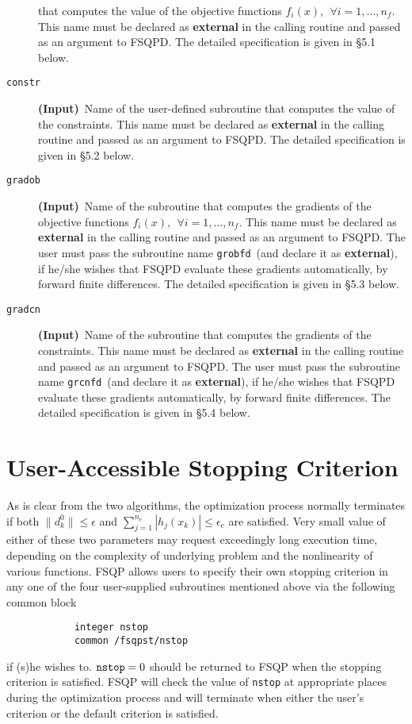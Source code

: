\begin{description}
                 that computes the value of the objective 
        functions $f_i(x),~~\forall i=1,\ldots,n_f.$ This name must
        be declared as {\bf external} in the calling routine 
        and passed as an argument to FSQPD.
        The detailed specification is given in \S 5.1 below.
\item[\tt constr]   {\bf (Input)}~Name of the user-defined subroutine
        that computes the value of the constraints. This name must
        be declared as {\bf external} in the calling routine 
        and passed as an argument to FSQPD.
        The detailed specification is given in \S 5.2 below. 
\item[\tt gradob]   {\bf (Input)}~Name of the subroutine that
        computes the gradients of the objective 
        functions $f_i(x),~~\forall i=1,\ldots,n_f.$ This name must
        be declared as {\bf external} in the calling routine 
        and passed as an argument to FSQPD.
        The user must pass the subroutine name 
        {\tt grobfd}~(and declare it as {\bf external}), 
        if he/she wishes that FSQPD evaluate
        these gradients automatically, by forward finite differences.
        The detailed specification is given in \S 5.3 below.
\item[\tt gradcn]   {\bf (Input)}~Name of the subroutine that
          computes the gradients of the constraints. 
          This name must be declared as {\bf external} in the calling 
          routine and passed as an argument to FSQPD.
          The user must pass the subroutine name {\tt grcnfd}~(and
          declare it as {\bf external}), if he/she wishes that 
          FSQPD evaluate these gradients automatically, 
          by forward finite differences.
          The detailed specification is given in \S 5.4 below.
\end{description}

\section{User-Accessible Stopping Criterion}
As is clear from the two algorithms, the optimization process
normally terminates if both 
$\|d_k^0\|\leq\epsilon$
and $\sum_{j=1}^{n_e}|h_j(x_k)|\leq\epsilon_e$ are satisfied. 
Very small value of either of these two parameters may request
exceedingly long execution time, depending on the complexity
of underlying problem and the nonlinearity of various functions. 
FSQP allows users to specify their own stopping criterion in any one of 
the four user-supplied subroutines mentioned above via the following
common block
\begin{verbatim}
            integer nstop
            common /fsqpst/nstop
\end{verbatim}
if (s)he wishes to.
${\tt nstop}=0$ should be returned to FSQP when the stopping criterion 
is satisfied.  FSQP will check the value of {\tt nstop} at appropriate places 
during the optimization process and will terminate when
either the user's criterion or the default criterion is satisfied.

